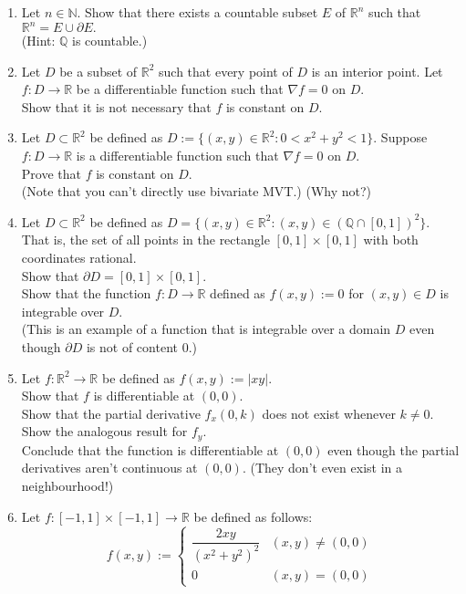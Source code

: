 \documentclass{article}
\begin{document}
\begin{enumerate}
	\item Let $n \in \mathbb{N}.$ Show that there exists a countable subset $E$ of $\mathbb{R}^n$ such that $\mathbb{R}^n = E \cup \partial E.$\\
	(Hint: $\mathbb{Q}$ is countable.)
	\item Let $D$ be a subset of $\mathbb{R}^2$ such that every point of $D$ is an interior point. Let $f : D \to \mathbb{R}$ be a differentiable function such that $\nabla f = 0$ on $D.$\\
	Show that it is not necessary that $f$ is constant on $D.$
	\item Let $D \subset \mathbb{R}^2$ be defined as $D := \{(x, y)\in\mathbb{R}^2 : 0 < x^2 + y^2 < 1\}.$ Suppose $f:D \to \mathbb{R}$ is a differentiable function such that $\nabla f = 0$ on $D.$\\
	Prove that $f$ is constant on $D.$ \\
	(Note that you can't directly use bivariate MVT.) \hfill (Why not?)
	\item Let $D \subset \mathbb{R}^2$ be defined as $D = \{(x, y) \in \mathbb{R}^2 : (x, y) \in (\mathbb{Q} \cap [0, 1])^2\}.$ That is, the set of all points in the rectangle $[0,1]\times[0,1]$ with both coordinates rational.\\
	Show that $\partial D = [0, 1]\times[0, 1].$\\
	Show that the function $f:D \to \mathbb{R}$ defined as $f(x, y) := 0$ for $(x, y) \in D$ is integrable over $D.$\\
	(This is an example of a function that is integrable over a domain $D$ even though $\partial D$ is not of content $0.$)
	\item Let $f:\mathbb{R}^2 \to \mathbb{R}$ be defined as $f(x, y) := |xy|.$\\
	Show that $f$ is differentiable at $(0, 0).$\\
	Show that the partial derivative $f_x(0, k)$ does not exist whenever $k \neq 0.$ Show the analogous result for $f_y.$\\
	Conclude that the function is differentiable at $(0, 0)$ even though the partial derivatives aren't continuous at $(0, 0).$ \hfill (They don't even exist in a neighbourhood!) 
	\item Let $f:[-1,1]\times[-1, 1] \to \mathbb{R}$ be defined as follows:
	\[f(x, y) := \left\{
	\begin{array}{cc}
		\dfrac{2xy}{(x^2 + y^2)^2} & (x, y) \neq (0, 0)\\
		0 & (x, y) = (0, 0)
	\end{array}
\]
\end{enumerate}
\end{document}
